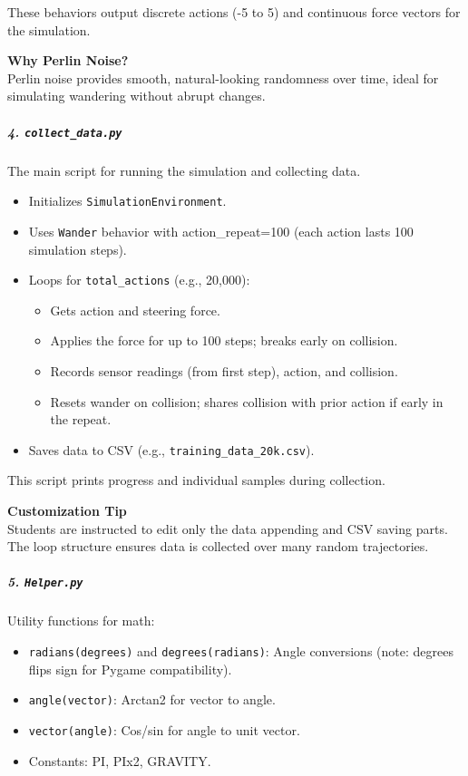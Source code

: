 These behaviors output discrete actions (-5 to 5) and continuous force vectors for the simulation.

\begin{framed}
\textbf{Why Perlin Noise?}\\
Perlin noise provides smooth, natural-looking randomness over time, ideal for simulating wandering without abrupt changes.
\end{framed}

\subparagraph{4. \texttt{collect\_data.py}}

The main script for running the simulation and collecting data.

\begin{itemize}
\item Initializes \texttt{SimulationEnvironment}.
\item Uses \texttt{Wander} behavior with action\_repeat=100 (each action lasts 100 simulation steps).
\item Loops for \texttt{total\_actions} (e.g., 20,000):

\begin{itemize}
\item Gets action and steering force.
\item Applies the force for up to 100 steps; breaks early on collision.
\item Records sensor readings (from first step), action, and collision.
\item Resets wander on collision; shares collision with prior action if early in the repeat.
\end{itemize}


\item Saves data to CSV (e.g., \texttt{training\_data\_20k.csv}).
\end{itemize}

This script prints progress and individual samples during collection.

\begin{framed}
\textbf{Customization Tip}\\
Students are instructed to edit only the data appending and CSV saving parts. The loop structure ensures data is collected over many random trajectories.
\end{framed}

\subparagraph{5. \texttt{Helper.py}}

Utility functions for math:

\begin{itemize}
\item \texttt{radians(degrees)} and \texttt{degrees(radians)}: Angle conversions (note: degrees flips sign for Pygame compatibility).
\item \texttt{angle(vector)}: Arctan2 for vector to angle.
\item \texttt{vector(angle)}: Cos/sin for angle to unit vector.
\item Constants: PI, PIx2, GRAVITY.
\end{itemize}

